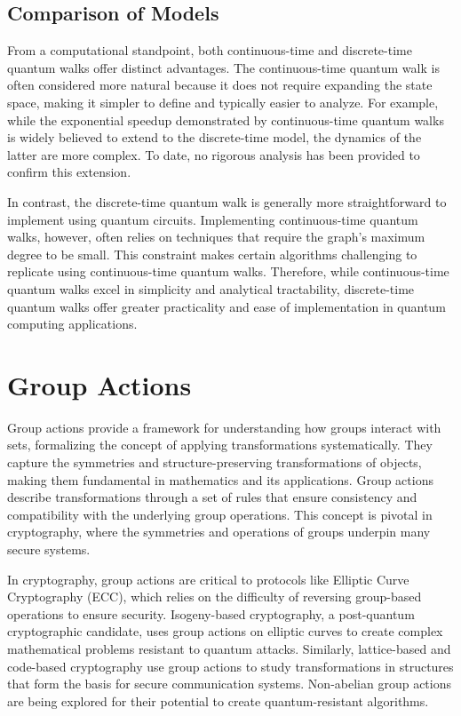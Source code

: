 \documentclass[11pt]{article}
\theoremstyle{definition}
\begin{document}
\subsection*{Comparison of Models}

From a computational standpoint, both continuous-time and discrete-time quantum walks offer distinct advantages. The continuous-time quantum walk is often considered more natural because it does not require expanding the state space, making it simpler to define and typically easier to analyze. For example, while the exponential speedup demonstrated by continuous-time quantum walks is widely believed to extend to the discrete-time model, the dynamics of the latter are more complex. To date, no rigorous analysis has been provided to confirm this extension.

In contrast, the discrete-time quantum walk is generally more straightforward to implement using quantum circuits. Implementing continuous-time quantum walks, however, often relies on techniques that require the graph's maximum degree to be small. This constraint makes certain algorithms challenging to replicate using continuous-time quantum walks. Therefore, while continuous-time quantum walks excel in simplicity and analytical tractability, discrete-time quantum walks offer greater practicality and ease of implementation in quantum computing applications.






\section{Group Actions}


Group actions provide a framework for understanding how groups interact with sets, formalizing the concept of applying transformations systematically. They capture the symmetries and structure-preserving transformations of objects, making them fundamental in mathematics and its applications. Group actions describe transformations through a set of rules that ensure consistency and compatibility with the underlying group operations. This concept is pivotal in cryptography, where the symmetries and operations of groups underpin many secure systems.

In cryptography, group actions are critical to protocols like Elliptic Curve Cryptography (ECC), which relies on the difficulty of reversing group-based operations to ensure security. Isogeny-based cryptography, a post-quantum cryptographic candidate, uses group actions on elliptic curves to create complex mathematical problems resistant to quantum attacks. Similarly, lattice-based and code-based cryptography use group actions to study transformations in structures that form the basis for secure communication systems. Non-abelian group actions are being explored for their potential to create quantum-resistant algorithms.
\end{document}
